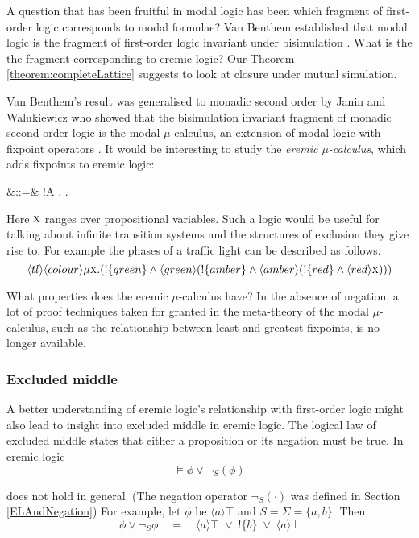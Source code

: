 A question that has been fruitful in modal logic has been which
fragment of first-order logic corresponds to modal formulae?  Van
Benthem established that modal logic is the fragment of first-order
logic invariant under bisimulation \cite{BlackburnP:modlog}. What is
the the fragment corresponding to eremic logic? Our Theorem
\ref{theorem:completeLattice} suggests to look at closure under mutual
simulation.  

Van Benthem's result was generalised to monadic second
order by Janin and Walukiewicz \cite{JaninD:expcomotpmcwrtmsol} who
showed that the bisimulation invariant fragment of monadic
second-order logic is the modal $\mu$-calculus, an extension of modal
logic with fixpoint operators \cite{KozenD:respromc}.  It would be
interesting to study the \emph{eremic $\mu$-calculus}, which adds
fixpoints to eremic logic:
\begin{GRAMMAR}
  \phi
     &::=&
  \TRUE
     \VERTICAL
  \phi \AND \psi
     \VERTICAL
  \phi
     \VERTICAL
  !A
     \VERTICAL
  \mu {}.\phi
     \VERTICAL
  \nu {}.\phi
     \VERTICAL
\end{GRAMMAR}

\NI Here $\text{\textsc{x}}$ ranges over propositional variables.  Such a logic
would be useful for talking about infinite transition systems and the
structures of exclusion they give rise to.  For example the phases of
a traffic light can be described as follows.
\[
   \langle tl \rangle \langle colour \rangle \mu \text{\textsc{x}}.
       (!\{green\} \land \langle green \rangle 
         (!\{amber\} \land \langle amber \rangle 
           (!\{red\} \land \langle red \rangle \text{\textsc{x}})))
\]

 What properties does the
eremic $\mu$-calculus have? In the absence of negation, a lot of proof
techniques taken for granted in the meta-theory of the modal
$\mu$-calculus, such as the relationship between least and greatest
fixpoints, is no longer available.

\subsubsection{Excluded middle}

A better understanding of eremic logic's relationship with first-order
logic might also lead to insight into excluded middle in eremic logic.
The logical law of excluded middle states that either a proposition or
its negation must be true. In eremic logic
\[
\models \phi \lor \neg_S(\phi)
\]

\NI does not hold in general. (The negation operator $\neg_{S}(\cdot)$
was defined in Section \ref{ELAndNegation}) For example, let $\phi$ be
$\langle a \rangle \top$ and $S = \Sigma = \{a, b\}$.  Then
\[
   \phi \lor \neg_{S} \phi 
       \quad=\quad 
   \langle a \rangle \top \; \lor \; ! \{b\} \; \lor \; \langle a \rangle \bot
\]

